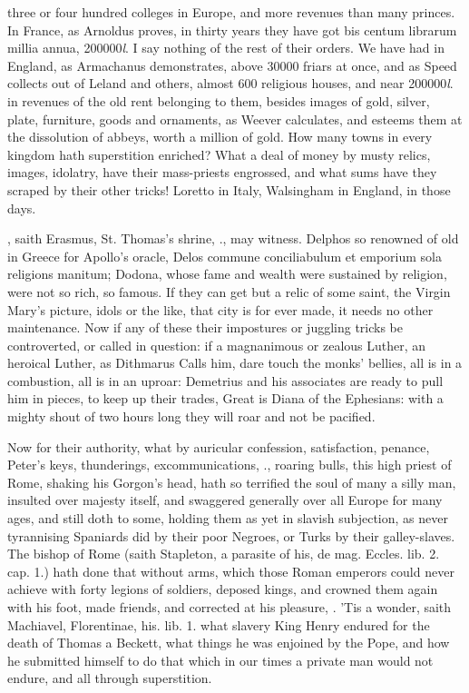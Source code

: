 {three or four hundred colleges in Europe, and more revenues than many
princes. In France, as Arnoldus proves, in thirty years they have got
bis centum librarum millia annua, 200\thinspace{}000\emph{l}. I say nothing of the rest
of their orders. We have had in England, as Armachanus demonstrates,
above 30\thinspace{}000 friars at once, and as Speed collects out of Leland
and others, almost 600 religious houses, and near 200\thinspace{}000\emph{l}. in
revenues of the old rent belonging to them, besides images of gold,
silver, plate, furniture, goods and ornaments, as Weever
calculates, and esteems them at the dissolution of abbeys, worth a
million of gold. How many towns in every kingdom hath superstition
enriched? What a deal of money by musty relics, images, idolatry, have
their mass-priests engrossed, and what sums have they scraped by their
other tricks! Loretto in Italy, Walsingham in England, in those days.

, saith
Erasmus, St. Thomas's shrine, \etc{}., may witness. Delphos so
renowned of old in Greece for Apollo's oracle, Delos commune
conciliabulum et emporium sola religions manitum; Dodona, whose fame
and wealth were sustained by religion, were not so rich, so famous. If
they can get but a relic of some saint, the Virgin Mary's picture,
idols or the like, that city is for ever made, it needs no other
maintenance. Now if any of these their impostures or juggling tricks be
controverted, or called in question: if a magnanimous or zealous
Luther, an heroical Luther, as Dithmarus Calls him, dare touch
the monks' bellies, all is in a combustion, all is in an uproar:
Demetrius and his associates are ready to pull him in pieces, to keep
up their trades,  Great is Diana of the Ephesians: with a mighty
shout of two hours long they will roar and not be pacified.

Now for their authority, what by auricular confession, satisfaction,
penance, Peter's keys, thunderings, excommunications, \etc{}., roaring
bulls, this high priest of Rome, shaking his Gorgon's head, hath so
terrified the soul of many a silly man, insulted over majesty itself,
and swaggered generally over all Europe for many ages, and still doth
to some, holding them as yet in slavish subjection, as never
tyrannising Spaniards did by their poor Negroes, or Turks by their
galley-slaves. The bishop of Rome (saith Stapleton, a parasite of
his, de mag. Eccles. lib. 2. cap. 1.) hath done that without arms,
which those Roman emperors could never achieve with forty legions of
soldiers, deposed kings, and crowned them again with his foot, made
friends, and corrected at his pleasure, \etc{}.  'Tis a wonder, saith
Machiavel, Florentinae, his. lib. 1. what slavery King Henry 
endured for the death of Thomas a Beckett, what things he was enjoined
by the Pope, and how he submitted himself to do that which in our times
a private man would not endure, and all through superstition.

}
